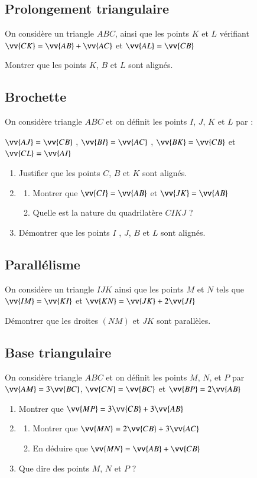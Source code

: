 \documentclass[oneside,12pt]{article}          %
\begin{document}
\subsection{Prolongement triangulaire}
On considère un triangle $ABC$, ainsi que les points $K$ et $L$ vérifiant $\vv{CK}=\vv{AB}+\vv{AC}$ et $\vv{AL}=\vv{CB}$

Montrer que les points $K$, $B$ et $L$ sont alignés.



\subsection{Brochette}
On considère triangle $ABC$ et on définit les points $I$, $J$, $K$ et $L$ par :

$\vv{AJ}=\vv{CB}$ \quad , \quad $\vv{BI}=\vv{AC}$ \quad , \quad $\vv{BK}=\vv{CB}$ \quad et \quad $\vv{CL}=\vv{AI}$
\begin{enumerate}
	\item Justifier que les points $C$, $B$ et $K$ sont alignés.
	\item \begin{enumerate}
		\item Montrer que $\vv{CI}=\vv{AB}$ et $\vv{JK}=\vv{AB}$
		\item Quelle est la nature du quadrilatère $CIKJ$ ?
	\end{enumerate}
	\item Démontrer que les points $I$ , $J$, $B$ et $L$ sont alignés.
\end{enumerate}



\subsection{Parallélisme}
On considère un triangle $IJK$ ainsi que les points $M$ et $N$ tels que $\vv{IM}=\vv{KI}$ et $\vv{KN}=\vv{JK}+2\vv{JI}$

Démontrer que les droites $(NM)$ et $JK$ sont parallèles.



\subsection{Base triangulaire}
On considère triangle $ABC$ et on définit les points $M$, $N$, et $P$ par $\vv{AM}=3\vv{BC}$, $\vv{CN}=\vv{BC}$ et $\vv{BP}=2\vv{AB}$
\begin{enumerate}
	\item Montrer que $\vv{MP}=3\vv{CB}+3\vv{AB}$
	\item \begin{enumerate}
		\item Montrer que $\vv{MN}=2\vv{CB}+3\vv{AC}$
		\item En déduire que $\vv{MN}=\vv{AB}+\vv{CB}$
	\end{enumerate}
	\item Que dire des points $M$, $N$ et $P$ ?
\end{enumerate}
 
\end{document}
